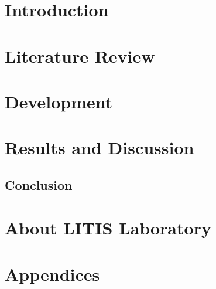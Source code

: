 \documentclass[14pt]{extreport}
\begin{document}
% 

\newpage
\listoffigures
\listoftables
\newpage
\tableofcontents
\newpage

\chapter*{Introduction}								%


\chapter{Literature Review}							%


\chapter{Development}								%


\chapter{Results and Discussion}					%


\newpage
\section*{Conclusion}


\chapter*{About LITIS Laboratory}					%


% 
\printbibliography

\chapter*{Appendices}								%

\end{document}
